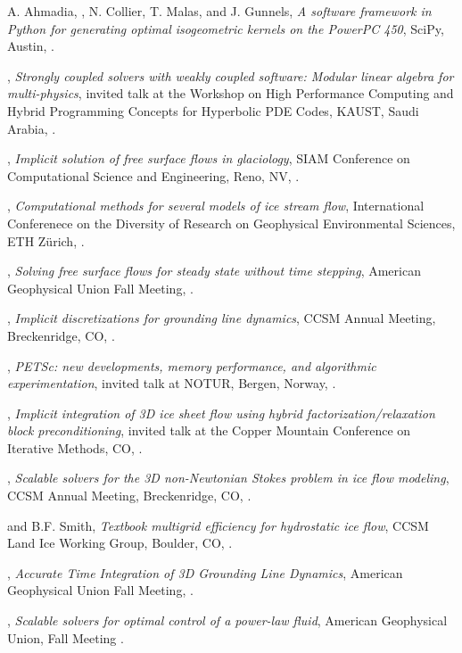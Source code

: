 \documentclass[10pt,letterpaper]{article}
\newcommand\ptitle[1]{\textit{#1}} %
\renewenvironment{itemize}{
  \begin{list}{}{
    \setlength{\leftmargin}{1.5em}
    \setlength{\itemsep}{0.25em}
    \setlength{\parskip}{0pt}
    \setlength{\parsep}{0.25em}
  }
}{
  \end{list}
}
\begin{document}
\begin{itemize}
\item A. Ahmadia, {\JedBrown}, N. Collier, T. Malas, and J. Gunnels, \ptitle{A software framework in Python for generating optimal isogeometric kernels on the PowerPC 450}, SciPy, Austin, .
\item {\JedBrown}, \ptitle{Strongly coupled solvers with weakly coupled software: Modular linear algebra for multi-physics}, invited talk at the Workshop on High Performance Computing and Hybrid Programming Concepts for Hyperbolic PDE Codes, KAUST, Saudi Arabia, .
\item {\JedBrown}, \ptitle{Implicit solution of free surface flows in glaciology}, SIAM Conference on Computational Science and Engineering, Reno, NV, .
\item {\JedBrown}, \ptitle{Computational methods for several models of ice stream flow}, International Conferenece on the Diversity of Research on Geophysical Environmental Sciences, ETH Z\"urich, .
\item {\JedBrown}, \ptitle{Solving free surface flows for steady state without time stepping}, American Geophysical Union Fall Meeting, .
\item {\JedBrown}, \ptitle{Implicit discretizations for grounding line dynamics}, CCSM Annual Meeting, Breckenridge, CO,  .
\item {\JedBrown}, \ptitle{PETSc: new developments, memory performance, and algorithmic experimentation}, invited talk at NOTUR, Bergen, Norway, .
\item {\JedBrown}, \ptitle{Implicit integration of 3D ice sheet flow using hybrid factorization/relaxation block preconditioning}, invited talk at the Copper Mountain Conference on Iterative Methods, CO, .
\item {\JedBrown}, \ptitle{Scalable solvers for the 3D non-Newtonian Stokes problem in ice flow modeling}, CCSM Annual Meeting, Breckenridge, CO, .
\item {\JedBrown} and B.F. Smith, \ptitle{Textbook multigrid efficiency for hydrostatic ice flow}, CCSM Land Ice Working Group, Boulder, CO, .
\item {\JedBrown}, \ptitle{Accurate Time Integration of 3D Grounding Line Dynamics}, American Geophysical Union Fall Meeting, .
\item {\JedBrown}, \ptitle{Scalable solvers for optimal control of a power-law fluid}, American Geophysical Union, Fall Meeting .
\end{itemize}
\end{document}
